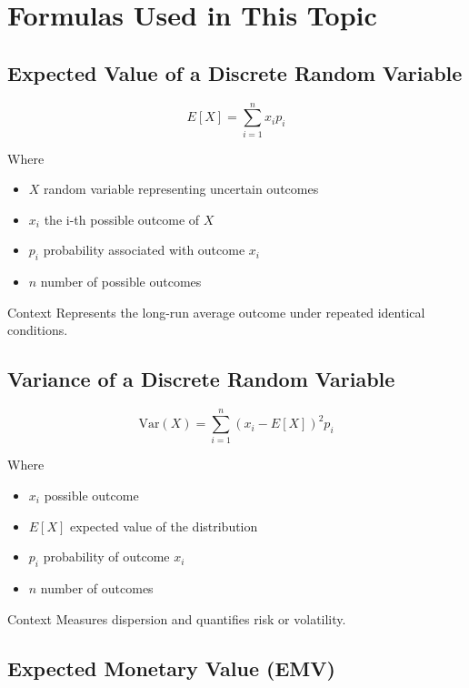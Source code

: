 \documentclass[11pt]{article}
\begin{document}
	
	
	\section{Formulas Used in This Topic}\label{formulas-section}
	
	\subsection{Expected Value of a Discrete Random Variable}\label{formula-expected-value}
	
	\[
	E[X] = \sum_{i=1}^{n} x_i p_i
	\]
	
	Where
	\begin{itemize}
		\item \(X\) random variable representing uncertain outcomes
		\item \(x_i\) the i-th possible outcome of \(X\)
		\item \(p_i\) probability associated with outcome \(x_i\)
		\item \(n\) number of possible outcomes
	\end{itemize}
	
	Context
	Represents the long-run average outcome under repeated identical conditions.
	
	\subsection{Variance of a Discrete Random Variable}\label{formula-variance}
	
	\[
	\mathrm{Var}(X) = \sum_{i=1}^{n} (x_i - E[X])^2 p_i
	\]
	
	Where
	\begin{itemize}
		\item \(x_i\) possible outcome
		\item \(E[X]\) expected value of the distribution
		\item \(p_i\) probability of outcome \(x_i\)
		\item \(n\) number of outcomes
	\end{itemize}
	
	Context
	Measures dispersion and quantifies risk or volatility.
	
	\subsection{Expected Monetary Value (EMV)}\label{formula-emv}
	
\end{document}
